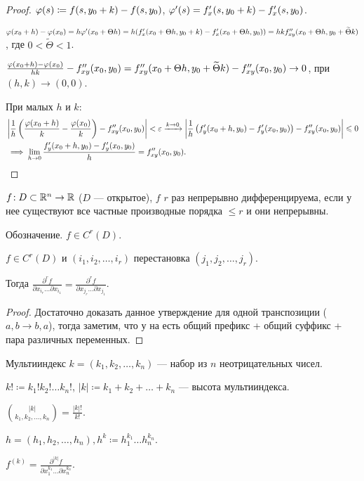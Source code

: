 \begin{proof}
    $\varphi(s) \coloneqq f(s, y_0 + k) - f(s, y_0)$, $\varphi'(s) = f'_x(s, y_0 + k) - f'_x(s, y_0)$.

    $\varphi(x_0+h) - \varphi(x_0) = h\varphi'(x_0 + \Theta h) = h(f'_x(x_0 + \Theta h, y_0 + k) - f'_x(x_0 + \Theta h, y_0)) = hk f''_{xy}(x_0 + \Theta h, y_0 + \widetilde{\Theta}k)$, где $0 < \widetilde{\Theta} < 1$.

    $\frac{\varphi(x_0 + h) - \varphi(x_0)}{hk} - f''_{xy}(x_0, y_0) = f''_{xy}(x_0 + \Theta h, y_0 + \widetilde{\Theta}k) - f''_{xy}(x_0, y_0) \to 0$, при $(h, k) \to (0, 0)$.

    При малых $h$ и  $k$:
    \begin{align*}
    &\left| \frac{1}{h} \left(\frac{\varphi(x_0 + h)}{k} - \frac{\varphi(x_0)}{k}\right) - f''_{xy}(x_0, y_0) \right| < \varepsilon
    \xrightarrow{k \to 0} \left| \frac{1}{h} \left( f'_y(x_0+h, y_0) - f'_y(x_0, y_0) \right) - f''_{xy}(x_0, y_0) \right| \leqslant 0 \\
    & \implies \lim\limits_{h \to 0} \frac{f'_y(x_0+h, y_0) - f'_y(x_0, y_0)}{h} = f''_{xy}(x_0, y_0).
    \end{align*}
\end{proof}
\begin{definition}
    $f\!: D \subset \mathbb{R}^n \to \mathbb{R}$ ($D$ --- открытое), $f$  $r$ раз непрерывно дифференцируема, если у нее существуют все частные производные порядка  $\le r$ и они непрерывны.

    Обозначение. $f \in C^r(D)$.
\end{definition}
\begin{theorem}
    $f \in C^r(D)$ и $(i_1, i_2, \ldots, i_r)$ перестановка $(j_1, j_2,\ldots,j_r)$.

Тогда $\frac{\partial^r f}{\partial x_{i_r}\ldots\partial x_{i_1}} = \frac{\partial^r f}{\partial x_{j_r} \ldots \partial x_{j_1}}$.
\end{theorem}
\begin{proof}
    Достаточно доказать данное утверждение для одной транспозиции ($a, b \to b, a$), тогда заметим, что у на есть общий префикс + общий суффикс + пара различных переменных. 
\end{proof}
\begin{definition}
    Мультииндекс $k = (k_1, k_2, \ldots, k_n)$ --- набор из $n$ неотрицательных чисел.

    $k! \coloneqq k_1!k_2!\ldots k_n!$, $|k| \coloneqq k_1 + k_2 + \ldots + k_n$ --- высота мультииндекса.

    $\binom{|k|}{k_1, k_2, \ldots, k_n} =  \frac{|k|!}{k!}$.

    $h=(h_1, h_2, \ldots, h_n), h^k \coloneqq h_1^{k_1}\ldots h_n^{k_n}$.

    $f^{(k)} = \frac{\partial^{|k|} f}{\partial x_1^{k_1} \ldots \partial x_n^{k_n}}$.
\end{definition}

